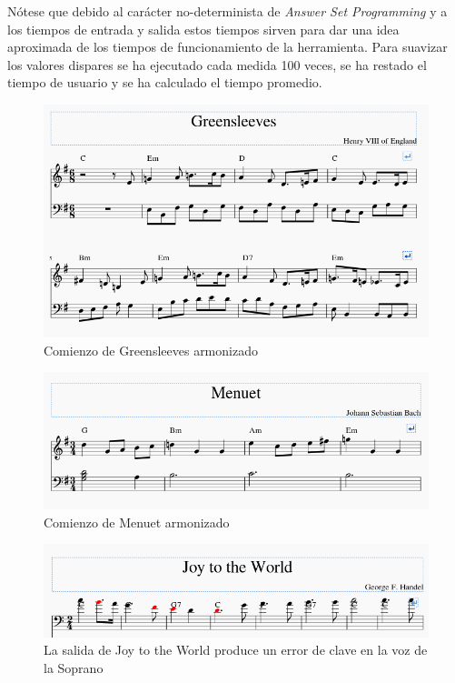  Nótese que debido al carácter no-determinista de \textit{Answer Set Programming} y a los tiempos de entrada y salida estos tiempos sirven para dar una idea aproximada de los tiempos de funcionamiento de la herramienta. Para suavizar los valores dispares se ha ejecutado cada medida 100 veces, se ha restado el tiempo de usuario y se ha calculado el tiempo promedio. 
 

  \begin{figure}
  	\centering
  	\includegraphics[width=0.8\linewidth]{imagenes/evaluation/greensleeves_harm.png}
  	\caption{Comienzo de Greensleeves armonizado}
  	\label{fig:greensleeves_harm}
  \end{figure}
   
    \begin{figure}
    	\centering
    	\includegraphics[width=0.8\linewidth]{imagenes/evaluation/menuet_harm.png}
    	\caption{Comienzo de Menuet armonizado}
    	\label{fig:menuet_harm}
    \end{figure}
  
        \begin{figure}
        	\centering
        	\includegraphics[width=0.8\linewidth]{imagenes/evaluation/joy_harm_err.png}
        	\caption{La salida de Joy to the World produce un error de clave en la voz de la Soprano}
        	\label{fig:joy_harm_err}
        \end{figure}
     
